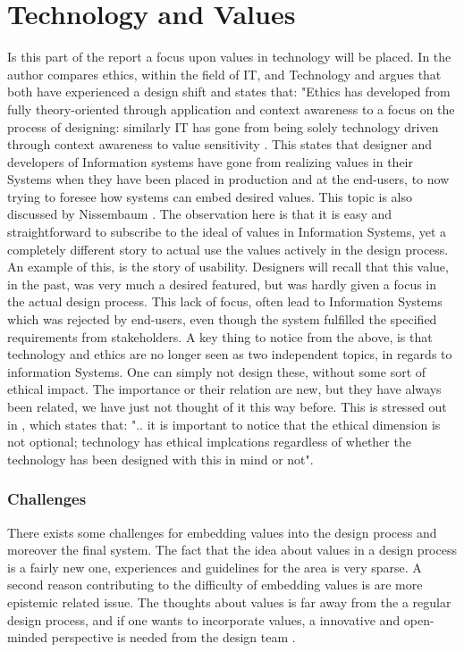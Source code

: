 
\section{Technology and Values}
Is this part of the report a focus upon values in technology will be placed. In \citep{EthicsAndTechnologyDesign} the author compares ethics, within the field of IT, and Technology and argues that both have experienced a design shift and states that: "Ethics has developed from fully theory-oriented through application and context awareness to a focus on the process of designing: similarly IT has gone from being solely technology driven through context awareness to value sensitivity \citep[p. 65]{EthicsAndTechnologyDesign}. This states that designer and developers of Information systems have gone from realizing values in their Systems when they have been placed in production and at the end-users, to now trying to foresee how systems can embed desired values. This topic is also discussed by Nissembaum \citep{EmbodyingValues}. The observation here is that it is easy and straightforward to subscribe to the ideal of values in Information Systems, yet a completely different story to actual use the values actively in the design process. An example of this, is the story of usability. Designers will recall that this value, in the past, was very much a desired featured, but was hardly given a focus in the actual design process. This lack of focus, often lead to Information Systems which was rejected by end-users, even though the system fulfilled the specified requirements from stakeholders.
A key thing to notice from the above, is that technology and ethics are no longer seen as two independent topics, in regards to information Systems. One can simply not design these, without some sort of ethical impact. The importance or their relation are new, but they have always been related, we have just not thought of it this way before. This is stressed out in \citep{EthicsAndTechnologyDesign}, which states that: ".. it is important to notice that the ethical dimension is not optional; technology has ethical implcations regardless of whether the technology has been designed with this in mind or not"\citep[p. 66]{EthicsAndTechnologyDesign}. 

\subsubsection{Challenges}
There exists some challenges for embedding values into the design process and moreover the final system. The fact that the idea about values in a design process is a fairly new one, experiences and guidelines for the area is very sparse. A second reason  contributing to the difficulty of embedding values is are more epistemic related issue. The thoughts about values is far away from the a regular design process, and if one wants to incorporate values, a innovative and open-minded perspective is needed from the design team \citep[p. 323]{EmbodyingValues}.


